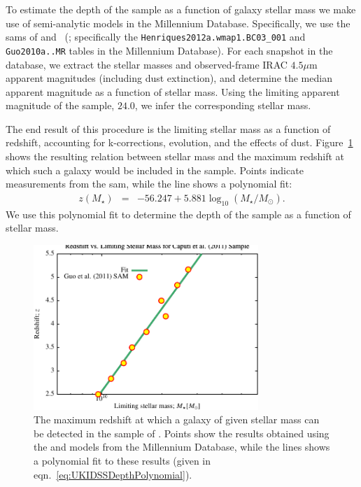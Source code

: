To estimate the depth of the \cite{caputi_stellar_2011} sample as a function of galaxy stellar mass we make use of semi-analytic models in the Millennium Database. Specifically, we use the \glspl{sam} of \cite{henriques_confronting_2012} and \citeauthor{guo_dwarf_2011}~(\citeyear{guo_dwarf_2011}; specifically the {\tt Henriques2012a.wmap1.BC03\_001} and {\tt Guo2010a..MR} tables in the Millennium Database). For each snapshot in the database, we extract the stellar masses and observed-frame IRAC $4.5\mu$m apparent magnitudes (including dust extinction), and determine the median apparent magnitude as a function of stellar mass. Using the limiting apparent magnitude of the \cite{caputi_stellar_2011} sample, $24.0$, we infer the corresponding stellar mass.

The end result of this procedure is the limiting stellar mass as a function of redshift, accounting for k-corrections, evolution, and the effects of dust. Figure~\ref{fig:UKIDSSUDSDepthFit} shows the resulting relation between stellar mass and the maximum redshift at which such a galaxy would be included in the sample. Points indicate measurements from the \gls{sam}, while the line shows a polynomial fit:
\begin{eqnarray}
 z(M_\star) &=& -56.247 + 5.881 \log_{10}(M_\star/M_\odot).
 \label{eq:UKIDSSDepthPolynomial}
\end{eqnarray}
We use this polynomial fit to determine the depth of the sample as a function of stellar mass.

\begin{figure}
 \begin{center}
 \includegraphics[width=85mm,trim=0mm 0mm 0mm 4mm,clip]{Plots/DataAnalysis/UKIDSSUDSMassLuminosityRelation.pdf}
 \end{center}
 \caption{The maximum redshift at which a galaxy of given stellar mass can be detected in the sample of \protect\cite{caputi_stellar_2011}. Points show the results obtained using the \protect\cite{henriques_confronting_2012} and \protect\cite{guo_dwarf_2011} models from the Millennium Database, while the lines shows a polynomial fit to these results (given in eqn.~\ref{eq:UKIDSSDepthPolynomial}).}
 \label{fig:UKIDSSUDSDepthFit}
\end{figure}

